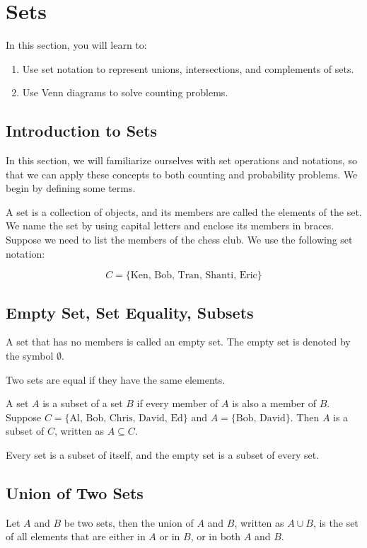 \section{Sets}

In this section, you will learn to:
\begin{enumerate}
    \item Use set notation to represent unions, intersections, and complements of sets.
    \item Use Venn diagrams to solve counting problems.
\end{enumerate}

\subsection{Introduction to Sets}

In this section, we will familiarize ourselves with set operations and notations, so that we can apply these concepts to both counting and probability problems. We begin by defining some terms.

A set is a collection of objects, and its members are called the elements of the set. We name the set by using capital letters and enclose its members in braces. Suppose we need to list the members of the chess club. We use the following set notation:

\[ C = \{ \text{Ken, Bob, Tran, Shanti, Eric} \} \]

\subsection{Empty Set, Set Equality, Subsets}

A set that has no members is called an empty set. The empty set is denoted by the symbol $\emptyset$.

Two sets are equal if they have the same elements.

A set $A$ is a subset of a set $B$ if every member of $A$ is also a member of $B$. Suppose $C = \{ \text{Al, Bob, Chris, David, Ed} \}$ and $A = \{ \text{Bob, David} \}$. Then $A$ is a subset of $C$, written as $A \subseteq C$.

Every set is a subset of itself, and the empty set is a subset of every set.

\subsection{Union of Two Sets}

Let $A$ and $B$ be two sets, then the union of $A$ and $B$, written as $A \cup B$, is the set of all elements that are either in $A$ or in $B$, or in both $A$ and $B$.

